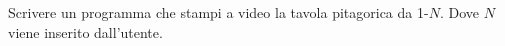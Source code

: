 \begin{Exercise}[label={ex:tavola}]
  Scrivere un programma che stampi a video la tavola pitagorica da 1-$N$. Dove $N$ viene inserito dall'utente.
\end{Exercise}

\begin{Answer}[ref={ex:tavola}]
  
\end{Answer}
